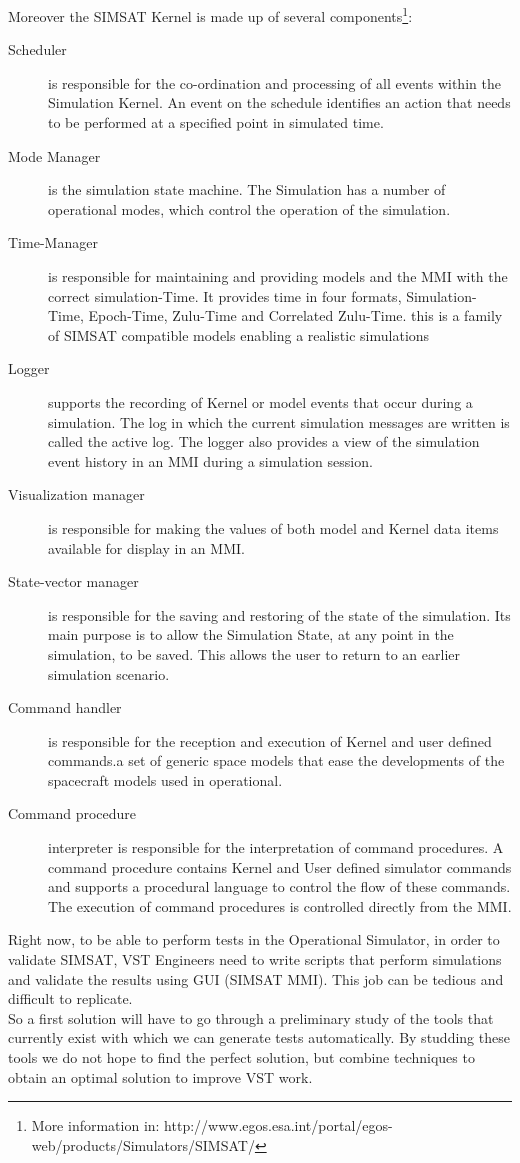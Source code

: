 Moreover the \ac{SIMSAT} Kernel is made up of several components\footnote{More information in: http://www.egos.esa.int/portal/egos-web/products/Simulators/SIMSAT/}:
\begin{description}
\item[Scheduler] is responsible for the co-ordination and processing of all events within the Simulation Kernel. An event on the schedule identifies an action that needs to be performed at a specified point in simulated time.
\item[Mode Manager] is the simulation state machine. The Simulation has a number of operational modes, which control the operation of the simulation.
\item[Time-Manager] is responsible for maintaining and providing models and the \ac{MMI} with the correct simulation-Time. It provides time in four formats, Simulation-Time, Epoch-Time, Zulu-Time and Correlated Zulu-Time. this is a family of SIMSAT compatible models enabling a realistic simulations
\item[Logger] supports the recording of Kernel or model events that occur during a simulation. The log in which the current simulation messages are written is called the active log. The logger also provides a view of the simulation event history in an \ac{MMI} during a simulation session.
\item[Visualization manager] is responsible for making the values of both model and Kernel data items available for display in an \ac{MMI}.
\item[State-vector manager] is responsible for the saving and restoring of the state of the simulation. Its main purpose is to allow the Simulation State, at any point in the simulation, to be saved. This allows the user to return to an earlier simulation scenario.
\item[Command handler] is responsible for the reception and execution of Kernel and user defined commands.a set of generic space models that ease the developments of the spacecraft models used in operational.
\item[Command procedure] interpreter is responsible for the interpretation of command procedures. A command procedure contains Kernel and User defined simulator commands and supports a procedural language to control the flow of these commands. The execution of command procedures is controlled directly from the \ac{MMI}.
\end{description}

Right now, to be able to perform tests in the Operational Simulator, in order to validate \ac{SIMSAT}, \ac{VST} Engineers need to write scripts that
perform simulations and validate the results using \ac{GUI} (\ac{SIMSAT} \ac{MMI}). This job can be tedious and difficult to replicate.\\
So a first solution will have to go through a preliminary study of the tools
that currently exist with which we can generate tests automatically.
By studding these tools we do not hope to find the perfect solution, but combine techniques to obtain an optimal solution to improve \ac{VST} work.
